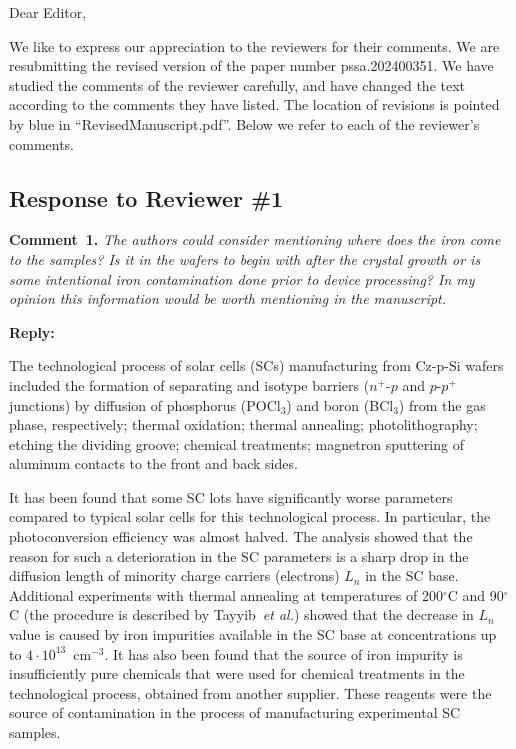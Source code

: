 \documentclass{WileyMSP-template}
\begin{document}
Dear Editor,

We like to express our appreciation to the reviewers for their comments.
We are resubmitting the revised version of the paper number pssa.202400351.
We have studied the comments of the reviewer carefully, and have changed the text according to the comments they
have listed.
The location of revisions is pointed by blue in ``RevisedManuscript.pdf''.
Below we refer to each of the reviewer’s comments.


\subsection*{Response to Reviewer \#1 }

\noindent
\textcolor[rgb]{0.00,0.50,1.00}{\textbf{Comment~1.}}
\emph{The authors could consider mentioning where does the iron come to the samples?
Is it in the wafers to begin with after the crystal growth or is some intentional iron contamination done prior to device processing?
In my opinion this information would be worth mentioning in the manuscript.}

\noindent
\textcolor[rgb]{0.51,0.00,0.00}{\textbf{Reply:}}

The technological process of solar cells (SCs) manufacturing from Cz-p-Si wafers included the formation of separating and isotype barriers
($n^+$-$p$ and $p$-$p^+$ junctions) by diffusion of phosphorus (POCl$_3$) and boron (BCl$_3$) from the gas phase, respectively;
thermal oxidation;
thermal annealing;
photolithography;
etching the dividing groove;
chemical treatments;
magnetron sputtering of aluminum contacts to the front and back sides.

It has been found that some SC lots have significantly worse parameters compared to typical solar cells for this technological process.
In particular, the photoconversion efficiency was almost halved.
The analysis showed that the reason for such a deterioration in the SC parameters is a sharp drop in the diffusion length of minority charge carriers (electrons) $L_n$ in the SC base.
Additional experiments with thermal annealing at temperatures of 200$^\circ$C and 90$^\circ$C
(the procedure is described by Tayyib~\emph{et al.}\cite{TAYYIB201221})
showed that the decrease in $L_n$ value is caused by iron impurities available in the SC base at concentrations up to $4\cdot10^{13}$~cm$^{-3}$.
It has also been found that the source of iron impurity is insufficiently pure chemicals that were used for chemical treatments in the technological process, obtained from another supplier.
These reagents were the source of contamination in the process of manufacturing experimental SC samples.
\end{document}
